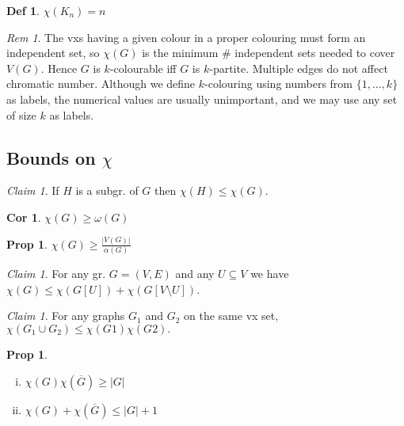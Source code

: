 \documentclass[11pt, fleqn, a4paper, landscape]{article}
\theoremstyle{plain} %
\newtheorem{pro}[thm]{Prop}
\newtheorem{cor}[thm]{Cor}
\theoremstyle{remark} %
\newtheorem{rem}[thm]{Rem}
\newtheorem{claim}[thm]{Claim}
\theoremstyle{definition} %
\newtheorem{defi}[thm]{Def}
\begin{document}
\begin{multicols}{5}
\begin{defi}
$\chi(K_n) = n$
\end{defi}
\addtocounter{thm}{1}
\begin{rem}
The vxs having a given colour in a proper colouring must form an independent set, so $\chi(G)$ is the minimum \# independent sets needed to cover $V (G).$ Hence $G$ is $k$-colourable iff $G$ is $k$-partite. Multiple edges do not affect chromatic number. Although we define
$k$-colouring using numbers from $\{1, \dots , k\}$ as labels, the numerical values are usually unimportant, and we may use any set of size $k$ as labels.
\end{rem}

\addtocounter{subsection}{1}
\addtocounter{thm}{1}\addtocounter{thm}{1}
\subsection{Bounds on $\chi$}
\begin{claim}
If $H$ is a subgr. of $G$ then $\chi(H) \le \chi(G)$.
\end{claim}

\begin{cor}
$\chi(G) \ge \omega(G)$
\end{cor}
\addtocounter{thm}{1}
\begin{pro}
$\chi(G) \ge\frac{|V (G)|}{\alpha(G)}$
\end{pro}

\begin{claim}
For any gr. $G = (V,E)$ and any $U \subseteq V$ we have $\chi(G) \le \chi(G[U]) + \chi(G[V \setminus U])$.
\end{claim}

\begin{claim}
For any graphs $G_1$ and $G_2$ on the same vx set, $\chi(G_1 \cup G_2) \le \chi(G1)\chi(G2).$
\end{claim}


\begin{pro}
\begin{enumerate}[(i)]
\item $\chi(G)\chi(\overline{G})\ge |G|$
\item $\chi(G)+\chi(\overline{G})\le |G|+1$
\end{enumerate}
\end{pro}


\end{multicols}
\end{document}
